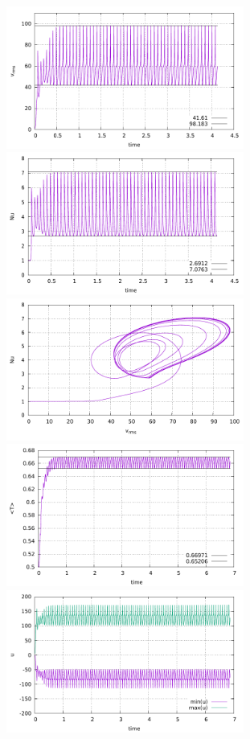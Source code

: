 \begin{center}
\includegraphics[width=7.8cm]{python_codes/fieldstone_28/results_case5/vrms.pdf}
\includegraphics[width=7.8cm]{python_codes/fieldstone_28/results_case5/Nu.pdf}\\
\includegraphics[width=7.8cm]{python_codes/fieldstone_28/results_case5/vrms_Nu.pdf}
\includegraphics[width=7.8cm]{python_codes/fieldstone_28/results_case5/Tavrg.pdf}\\
\includegraphics[width=7.8cm]{python_codes/fieldstone_28/results_case5/u.pdf}

\end{center}
